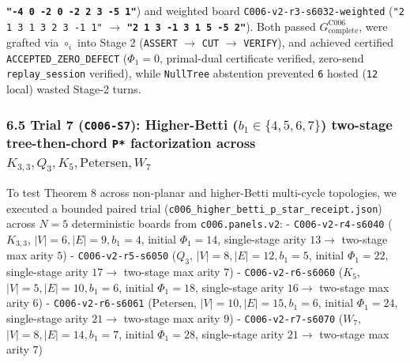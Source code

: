 \documentclass[
  11pt,
]{article}
\newcommand{\passthrough}[1]{#1}
\begin{document}
\begin{enumerate}
  \textbf{\passthrough{\lstinline!"-4 0 -2 0 -2 2 3 -5 1"!}}) and
  weighted board \nolinkurl{C006-v2-r3-s6032-weighted}
  (\passthrough{\lstinline!"2 1 3 1 3 2 3 -1 1"!} \(\to\)
  \textbf{\passthrough{\lstinline!"2 1 3 -1 3 1 5 -5 2"!}}). Both passed
  \(G_{\text{complete}}^{\text{C006}}\), were grafted via \(\circ_i\)
  into Stage 2 (\passthrough{\lstinline!ASSERT!} \(\to\)
  \passthrough{\lstinline!CUT!} \(\to\)
  \passthrough{\lstinline!VERIFY!}), and achieved certified
  \nolinkurl{ACCEPTED_ZERO_DEFECT} (\(\Phi_1 = 0\), primal-dual
  certificate verified, zero-send \nolinkurl{replay_session} verified),
  while \passthrough{\lstinline!NullTree!} abstention prevented
  \passthrough{\lstinline!6!} hosted (\passthrough{\lstinline!12!}
  local) wasted Stage-2 turns.
\end{enumerate}

\subsubsection{\texorpdfstring{6.5 Trial 7 (\texttt{C006-S7}):
Higher-Betti
(\(b_1 \in \{4,\allowbreak  5,\allowbreak  6,\allowbreak  7\}\))
two-stage tree-then-chord \texttt{P*} factorization across
\(K_{3,\allowbreak 3},\allowbreak  Q_3,\allowbreak  K_5,\allowbreak  \text{Petersen},\allowbreak  W_7\)}{6.5 Trial 7 (C006-S7): Higher-Betti (b\_1 \textbackslash in \textbackslash\{4,\textbackslash allowbreak  5,\textbackslash allowbreak  6,\textbackslash allowbreak  7\textbackslash\}) two-stage tree-then-chord P* factorization across K\_\{3,\textbackslash allowbreak 3\},\textbackslash allowbreak  Q\_3,\textbackslash allowbreak  K\_5,\textbackslash allowbreak  \textbackslash text\{Petersen\},\textbackslash allowbreak  W\_7}}\label{trial-7-c006-s7-higher-betti-b_1-in-4-5-6-7-two-stage-tree-then-chord-p-factorization-across-k_33-q_3-k_5-textpetersen-w_7}

To test Theorem 8 across non-planar and higher-Betti multi-cycle
topologies, we executed a bounded paired trial
(\nolinkurl{c006_higher_betti_p_star_receipt.json}) across \(N = 5\)
deterministic boards from \nolinkurl{c006.panels.v2}: -
\nolinkurl{C006-v2-r4-s6040} (\(K_{3,\allowbreak 3}\),
\(|V|=6,\allowbreak  |E|=9,\allowbreak  b_1=4\), initial
\(\Phi_1 = 14\), single-stage arity \(13 \to\) two-stage max arity
\(5\)) - \nolinkurl{C006-v2-r5-s6050} (\(Q_3\),
\(|V|=8,\allowbreak  |E|=12,\allowbreak  b_1=5\), initial
\(\Phi_1 = 22\), single-stage arity \(17 \to\) two-stage max arity
\(7\)) - \nolinkurl{C006-v2-r6-s6060} (\(K_5\),
\(|V|=5,\allowbreak  |E|=10,\allowbreak  b_1=6\), initial
\(\Phi_1 = 18\), single-stage arity \(16 \to\) two-stage max arity
\(6\)) - \nolinkurl{C006-v2-r6-s6061} (\(\text{Petersen}\),
\(|V|=10,\allowbreak  |E|=15,\allowbreak  b_1=6\), initial
\(\Phi_1 = 24\), single-stage arity \(21 \to\) two-stage max arity
\(9\)) - \nolinkurl{C006-v2-r7-s6070} (\(W_7\),
\(|V|=8,\allowbreak  |E|=14,\allowbreak  b_1=7\), initial
\(\Phi_1 = 28\), single-stage arity \(21 \to\) two-stage max arity
\(7\))
\end{document}
